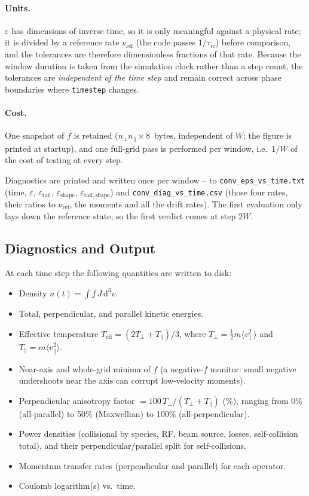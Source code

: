 \documentclass[11pt,a4paper]{article}
\newcommand{\vp}{v_\perp}
\newcommand{\vpa}{v_\parallel}
\begin{document}
\paragraph{Units.}  $\varepsilon$ has dimensions of inverse time, so it is only
meaningful against a physical rate; it is divided by a reference rate
$\nu_\mathrm{ref}$ (the code passes $1/\tau_{ie}$) before comparison, and the
tolerances are therefore dimensionless fractions of that rate.  Because the
window duration is taken from the simulation clock rather than a step count, the
tolerances are \emph{independent of the time step} and remain correct across
phase boundaries where \texttt{timestep} changes.

\paragraph{Cost.}  One snapshot of $f$ is retained
($n_\perp n_\parallel \times 8$~bytes, independent of $W$; the figure is printed
at startup), and one full-grid pass is performed per window, i.e.\ $1/W$ of the
cost of testing at every step.

Diagnostics are printed and written once per window -- to
\texttt{conv\_eps\_vs\_time.txt} (time, $\varepsilon$,
$\varepsilon_\mathrm{tail}$, $\varepsilon_\mathrm{shape}$,
$\varepsilon_\mathrm{tail,shape}$) and \texttt{conv\_diag\_vs\_time.csv}
(those four rates, their ratios to $\nu_\mathrm{ref}$, the moments and all the
drift rates).  The first evaluation only lays down the reference state, so the
first verdict comes at step $2W$.

\subsection{Diagnostics and Output}

At each time step the following quantities are written to disk:
\begin{itemize}
  \item Density $n(t) = \int f\,J\,\mathrm{d}^3v$.
  \item Total, perpendicular, and parallel kinetic energies.
  \item Effective temperature $T_\mathrm{eff} = (2T_\perp + T_\parallel)/3$,
        where $T_\perp = \tfrac{1}{2}m\langle \vp^2 \rangle$ and
        $T_\parallel = m\langle \vpa^2 \rangle$.
  \item Near-axis and whole-grid minima of $f$ (a negative-$f$ monitor: small
        negative undershoots near the axis can corrupt low-velocity moments).
  \item Perpendicular anisotropy factor $= 100\,T_\perp/(T_\perp + T_\parallel)$
        (\%), ranging from 0\% (all-parallel) to 50\% (Maxwellian) to 100\%
        (all-perpendicular).
  \item Power densities (collisional by species, RF, beam source, losses,
        self-collision total), and their perpendicular/parallel split for
        self-collisions.
  \item Momentum transfer rates (perpendicular and parallel) for each
        operator.
  \item Coulomb logarithm(s) vs.\ time.
\end{itemize}
\end{document}
